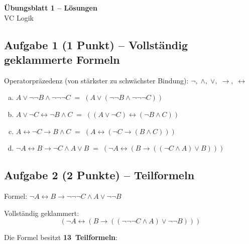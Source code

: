 \documentclass[a4paper,12pt]{article}
\begin{document}
\begin{center}
{\LARGE\bfseries \"Ubungsblatt 1 -- L\"osungen}\\[0.5em]
{\large VC Logik}
\end{center}

\bigskip

\subsection*{Aufgabe 1 \textnormal{(1 Punkt)} -- Vollst\"andig geklammerte Formeln}

Operatorpr\"azedenz (von st\"arkster zu schw\"achster Bindung):
$\neg,\; \wedge,\; \vee,\; \to,\; \leftrightarrow$

\begin{enumerate}[(a)]
\item $A \vee \neg\neg B \wedge \neg\neg\neg C
      \;=\; (A \vee (\neg\neg B \wedge \neg\neg\neg C))$

\item $A \vee \neg C \leftrightarrow \neg B \wedge C
      \;=\; ((A \vee \neg C) \leftrightarrow (\neg B \wedge C))$

\item $A \leftrightarrow \neg C \to B \wedge C
      \;=\; (A \leftrightarrow (\neg C \to (B \wedge C)))$

\item $\neg A \leftrightarrow B \to \neg C \wedge A \vee B
      \;=\; (\neg A \leftrightarrow (B \to ((\neg C \wedge A) \vee B)))$
\end{enumerate}

\bigskip

\subsection*{Aufgabe 2 \textnormal{(2 Punkte)} -- Teilformeln}

Formel: $\neg A \leftrightarrow B \to \neg\neg\neg C \wedge A \vee \neg\neg B$

\medskip
Vollst\"andig geklammert:
\[
  (\neg A \leftrightarrow (B \to ((\neg\neg\neg C \wedge A) \vee \neg\neg B)))
\]

Die Formel besitzt \textbf{13~Teilformeln}:
\end{document}
